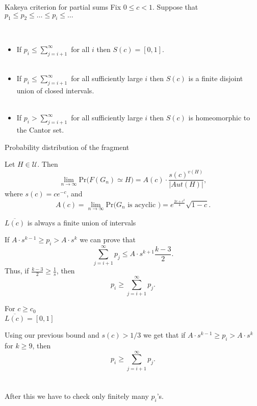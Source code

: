 \documentclass[handout, 11pt]{beamer}
\newcommand{\Ln}{\lim\limits_{n\to \infty}}
\begin{document}
\begin{frame}{Kakeya criterion for partial sums}
  Fix $0\leq c < 1$. Suppose that
  $p_1\leq p_2\leq \dots\leq p_i\leq\dots$
   \vfill
  \begin{theorem}
  ~	\vfill
  \begin{itemize}[leftmargin=5mm]
  	\item If $p_i\leq \sum_{j=i+1}^\infty$ for all $i$ then
  	$S(c)=[0,1]$.\\~\\
  	
  	\item If $p_i\leq \sum_{j=i+1}^\infty$ for all sufficiently 
  	large $i$ then $S(c)$ is a finite disjoint union of closed
  	intervals.\\~\\
  	
  	\item If $p_i > \sum_{j=i+1}^\infty$ for all sufficiently large
  	$i$	then $S(c)$ is homeomorphic to the Cantor set.
	\end{itemize}
	\end{theorem}
\end{frame}

\begin{frame}{Probability distribution of the fragment}
	\begin{theorem}
		Let $H\in \mathcal{U}$. Then
		\[
		\Ln \mathrm{Pr}\big( F(G_n)\simeq H  \big)
		= A(c) \cdot \frac{s(c)^{v(H)}}{|Aut(H)|},
		\]
		where $s(c)=ce^{-c}$, and 
		\[
		A(c)=\Ln \mathrm{Pr}\big( G_n \text{ is acyclic }\big)
		= e^{\frac{2c+c^2}{4}}\sqrt{1-c}.
		\] 		
	\end{theorem}
\end{frame}

\begin{frame}
	\begin{theorem}
		$\overline{L(c)}$ is always a finite union of intervals
	\end{theorem}
\vfill
	If $A\cdot s^{k-1}\geq p_i> A\cdot s^k$ we can prove that
	\[
	\sum_{j=i+1}^\infty p_j\leq A\cdot s^{k+1}\frac{k-3}{2}.\]
	Thus, if $\frac{k-3}{2}\geq \frac{1}{s}$, then
	\[
	p_i \geq \sum_{j=i+1}^\infty p_j.
	\]
\end{frame}

\begin{frame}
\begin{theorem}
	For $c\geq c_0$\\
	$\overline{L(c)}=[0,1]$
\end{theorem}
\vfill
Using our previous bound and $s(c)>1/3$ we get that
if $A\cdot s^{k-1}\geq p_i> A\cdot s^k$ for  $k\geq 9$, then
\[
p_i \geq \sum_{j=i+1}^\infty p_j.
\]
\\~\\
After this we have to check only finitely many $p_i$'s.
\end{frame}
\end{document}
